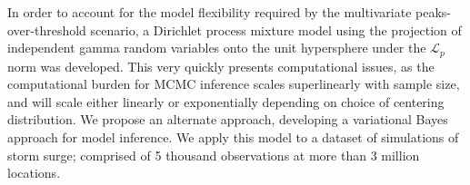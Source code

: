 In order to account for the model flexibility required by the multivariate
    peaks-over-threshold scenario, a Dirichlet process mixture model using
    the projection of independent gamma random variables onto the unit 
    hypersphere under the $\mathcal{L}_p$ norm was developed.  This very
    quickly presents computational issues, as the computational burden for
    MCMC inference scales superlinearly with sample size, and will scale
    either linearly or exponentially depending on choice of centering 
    distribution. We propose an alternate approach, developing a 
    variational Bayes approach for model inference.  We apply this model
    to a dataset of simulations of storm surge; comprised of 5 thousand
    observations at more than 3 million locations.
    
